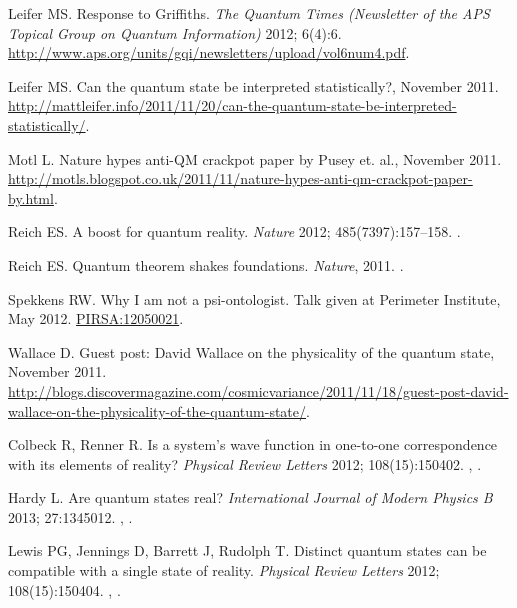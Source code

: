 \documentclass[DIV=calc,fontsize=12pt]{scrartcl} %
\theoremstyle{definition}
\theoremstyle{plain}
\begin{document}
\begin{thebibliography}{999}
Leifer MS.
\newblock Response to Griffiths.
\newblock \emph{The Quantum Times (Newsletter of the APS Topical Group on
Quantum Information)} 2012; 6(4):6.
\newblock \url{http://www.aps.org/units/gqi/newsletters/upload/vol6num4.pdf}.

Leifer MS.
\newblock Can the quantum state be interpreted statistically?, November 2011.
\newblock \url{http://mattleifer.info/2011/11/20/can-the-quantum-state-be-interpreted-statistically/}.

Motl L.
\newblock Nature hypes anti-QM crackpot paper by Pusey et. al., November 2011.
\newblock \url{http://motls.blogspot.co.uk/2011/11/nature-hypes-anti-qm-crackpot-paper-by.html}.

Reich ES.
\newblock A boost for quantum reality.
\newblock \emph{Nature} 2012; 485(7397):157--158.
\newblock \href {http://dx.doi.org/10.1038/485157a}
{}.

Reich ES.
\newblock Quantum theorem shakes foundations.
\newblock \emph{Nature}, 2011.
\newblock \href {http://dx.doi.org/10.1038/nature.2011.9392}
{}.

Spekkens RW.
\newblock Why I am not a psi-ontologist.
\newblock Talk given at Perimeter Institute, May 2012.
\newblock \href{http://pirsa.org/12050021/}{PIRSA:12050021}.

Wallace D.
\newblock Guest post: David Wallace on the physicality of the quantum state, November 2011.
\newblock \url{http://blogs.discovermagazine.com/cosmicvariance/2011/11/18/guest-post-david-wallace-on-the-physicality-of-the-quantum-state/}.

Colbeck R, Renner R.
\newblock Is a system's wave function in one-to-one correspondence with its
elements of reality?
\newblock \emph{Physical Review Letters} 2012; 108(15):150402.
\newblock \href {http://arxiv.org/abs/1111.6597} {},
\href {http://dx.doi.org/10.1103/PhysRevLett.108.150402}
{}.

Hardy L.
\newblock Are quantum states real?
\newblock \emph{International Journal of Modern Physics B} 2013; 27:1345012.
\newblock \href {http://arxiv.org/abs/1205.1439} {},
\href {http://dx.doi.org/10.1142/S0217979213450124}
{}.

Lewis PG, Jennings D, Barrett J, Rudolph T.
\newblock Distinct quantum states can be compatible with a single state of
reality.
\newblock \emph{Physical Review Letters} 2012; 108(15):150404.
\newblock \href {http://arxiv.org/abs/1201.6554} {},
\href {http://dx.doi.org/10.1103/PhysRevLett.109.150404}
{}.


\end{thebibliography}
\end{document}
